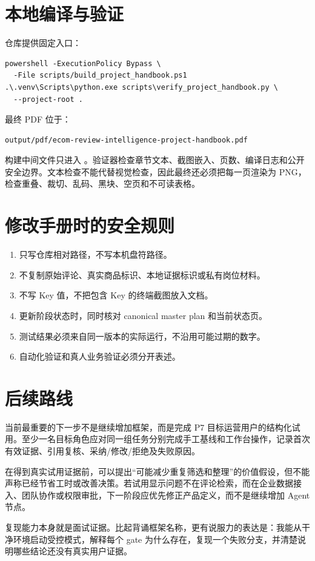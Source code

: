 \section{本地编译与验证}

仓库提供固定入口：

\begin{lstlisting}[language={}]
powershell -ExecutionPolicy Bypass \
  -File scripts/build_project_handbook.ps1
.\.venv\Scripts\python.exe scripts\verify_project_handbook.py \
  --project-root .
\end{lstlisting}

最终 PDF 位于：

\begin{lstlisting}[language={}]
output/pdf/ecom-review-intelligence-project-handbook.pdf
\end{lstlisting}

构建中间文件只进入 。验证器检查章节文本、截图嵌入、页数、编译日志和公开安全边界。文本检查不能代替视觉检查，因此最终还必须把每一页渲染为 PNG，检查重叠、裁切、乱码、黑块、空页和不可读表格。

\section{修改手册时的安全规则}

\begin{enumerate}
  \item 只写仓库相对路径，不写本机盘符路径。
  \item 不复制原始评论、真实商品标识、本地证据标识或私有岗位材料。
  \item 不写 Key 值，不把包含 Key 的终端截图放入文档。
  \item 更新阶段状态时，同时核对 canonical master plan 和当前状态页。
  \item 测试结果必须来自同一版本的实际运行，不沿用可能过期的数字。
  \item 自动化验证和真人业务验证必须分开表述。
\end{enumerate}

\section{后续路线}

当前最重要的下一步不是继续增加框架，而是完成 P7 目标运营用户的结构化试用。至少一名目标角色应对同一组任务分别完成手工基线和工作台操作，记录首次有效证据、引用复核、采纳/修改/拒绝及失败原因。

在得到真实试用证据前，可以提出“可能减少重复筛选和整理”的价值假设，但不能声称已经节省工时或改善决策。若试用显示问题不在评论检索，而在企业数据接入、团队协作或权限审批，下一阶段应优先修正产品定义，而不是继续增加 Agent 节点。

\begin{interviewbox}
复现能力本身就是面试证据。比起背诵框架名称，更有说服力的表达是：我能从干净环境启动受控模式，解释每个 gate 为什么存在，复现一个失败分支，并清楚说明哪些结论还没有真实用户证据。
\end{interviewbox}
